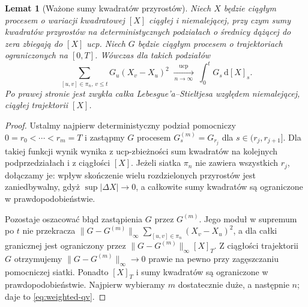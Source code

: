 \documentclass[11pt,a4paper,oneside]{report}
\numberwithin{equation}{chapter}
\theoremstyle{plain}
\newtheorem{lemat}[twierdzenie]{Lemat}
\theoremstyle{definition}
\theoremstyle{remark}
\newcommand{\dd}{\mathrm{d}}
\newcommand{\norm}[1]{\lVert #1\rVert}
\begin{document}
\begin{lemat}[Ważone sumy kwadratów przyrostów]\label{lem:volIII:03:02}
\label{lem:weighted-qv}
Niech $X$ będzie ciągłym procesem o wariacji kwadratowej
$[X]$ ciągłej i niemalejącej, przy czym sumy kwadratów
przyrostów na deterministycznych podziałach o średnicy
dążącej do zera zbiegają do $[X]$ ucp. Niech $G$ będzie
ciągłym procesem o trajektoriach ograniczonych na $[0,T]$.
Wówczas dla takich podziałów
\[
\sum_{[u,v]\in\pi_n,\,v\le t}G_u(X_v-X_u)^2
\ \xrightarrow[\,n\to\infty\,]{\mathrm{ucp}}\
\int_0^tG_s\,\dd[X]_s.
\tag{3.2}\label{eq:weighted-qv}
\]
Po prawej stronie jest zwykła całka Lebesgue'a--Stieltjesa
względem niemalejącej, ciągłej trajektorii $[X]$.
\end{lemat}
\begin{proof}
Ustalmy najpierw deterministyczny podział pomocniczy
$0=r_0<\cdots<r_m=T$ i zastąpmy $G$ procesem
$G^{(m)}_s=G_{r_j}$ dla $s\in(r_j,r_{j+1}]$.
Dla takiej funkcji wynik wynika z ucp-zbieżności
sum kwadratów na kolejnych podprzedziałach i z
ciągłości $[X]$. Jeżeli siatka $\pi_n$ nie zawiera
wszystkich $r_j$, dołączamy je: wpływ skończenie wielu
rozdzielonych przyrostów jest zaniedbywalny, gdyż
$\sup|\Delta X|\to0$, a całkowite sumy kwadratów są
ograniczone w prawdopodobieństwie.

Pozostaje oszacować błąd zastąpienia $G$ przez $G^{(m)}$.
Jego moduł w supremum po $t$ nie przekracza
$\norm{G-G^{(m)}}_\infty\sum_{[u,v]\in\pi_n}(X_v-X_u)^2$,
a dla całki granicznej jest ograniczony przez
$\norm{G-G^{(m)}}_\infty[X]_T$. Z ciągłości trajektorii
$G$ otrzymujemy $\norm{G-G^{(m)}}_\infty\to0$ prawie
na pewno przy zagęszczaniu pomocniczej siatki. Ponadto
$[X]_T$ i sumy kwadratów są ograniczone w prawdopodobieństwie.
Najpierw wybieramy $m$ dostatecznie duże, a następnie $n$;
daje to \eqref{eq:weighted-qv}.
\end{proof}
\end{document}
